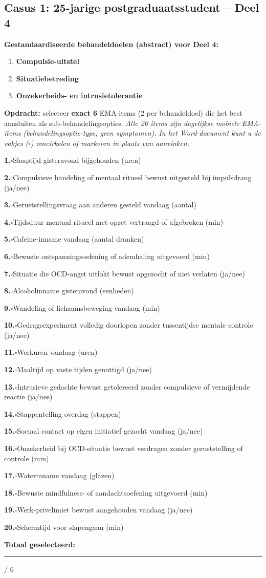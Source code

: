 \documentclass[11pt,a4paper]{article}
\newcommand{\checkitemBFS}[2]{%
\noindent\small\textbf{#1.}\hspace{0.45em}$\square$\hspace{0.4em}#2\par\vspace{0.20em}}
\begin{document}
\newpage
\subsection*{Casus 1: 25-jarige postgraduaatsstudent -- Deel 4}

\begin{contextbox}
\small\textbf{Gestandaardiseerde behandeldoelen (abstract) voor Deel 4:}
\begin{enumerate}[topsep=2pt,itemsep=1pt,label=\arabic*.]
\item \textbf{Compulsie-uitstel}
\item \textbf{Situatiebetreding}
\item \textbf{Onzekerheids- en intrusietolerantie}
\end{enumerate}
\end{contextbox}

\begin{responsebox}
\small\textbf{Opdracht:} selecteer \textbf{exact 6} EMA-items (2 per behandeldoel) die het best aansluiten als sub-behandelingsopties.
\textit{Alle 20 items zijn dagelijkse mobiele EMA-items (behandelingsoptie-type, geen symptomen).}
\textit{In het Word-document kunt u de vakjes ($\square$) omcirkelen of markeren in plaats van aanvinken.}

\checkitemBFS{1}{Slaaptijd gisteravond bijgehouden (uren)}
\checkitemBFS{2}{Compulsieve handeling of mentaal ritueel bewust uitgesteld bij impulsdrang (ja/nee)}
\checkitemBFS{3}{Geruststellingsvraag aan anderen gesteld vandaag (aantal)}
\checkitemBFS{4}{Tijdsduur mentaal ritueel met opzet vertraagd of afgebroken (min)}
\checkitemBFS{5}{Cafeine-inname vandaag (aantal dranken)}
\checkitemBFS{6}{Bewuste ontspanningsoefening of ademhaling uitgevoerd (min)}
\checkitemBFS{7}{Situatie die OCD-angst uitlokt bewust opgezocht of niet verlaten (ja/nee)}
\checkitemBFS{8}{Alcoholinname gisteravond (eenheden)}
\checkitemBFS{9}{Wandeling of lichaamsbeweging vandaag (min)}
\checkitemBFS{10}{Gedragsexperiment volledig doorlopen zonder tussentijdse mentale controle (ja/nee)}
\checkitemBFS{11}{Werkuren vandaag (uren)}
\checkitemBFS{12}{Maaltijd op vaste tijden genuttigd (ja/nee)}
\checkitemBFS{13}{Intrusieve gedachte bewust getolereerd zonder compulsieve of vermijdende reactie (ja/nee)}
\checkitemBFS{14}{Stappentelling overdag (stappen)}
\checkitemBFS{15}{Sociaal contact op eigen initiatief gezocht vandaag (ja/nee)}
\checkitemBFS{16}{Onzekerheid bij OCD-situatie bewust verdragen zonder geruststelling of controle (min)}
\checkitemBFS{17}{Waterinname vandaag (glazen)}
\checkitemBFS{18}{Bewuste mindfulness- of aandachtsoefening uitgevoerd (min)}
\checkitemBFS{19}{Werk-privelimiet bewust aangehouden vandaag (ja/nee)}
\checkitemBFS{20}{Schermtijd voor slapengaan (min)}
\vspace{0.4em}
\noindent\textbf{Totaal geselecteerd:}\hspace{0.5em}\rule{1.2cm}{0.25pt}\hspace{0.2em}/ 6
\end{responsebox}
\end{document}
